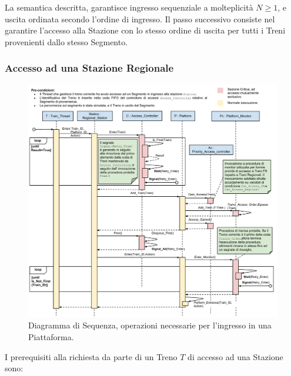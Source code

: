 	La semantica descritta, garantisce ingresso sequenziale a molteplicità $N\ge1$, e uscita ordinata secondo l'ordine di ingresso. Il passo successivo consiste nel garantire l'accesso alla Stazione con lo stesso ordine di uscita per tutti i Treni provenienti dallo stesso Segmento.


		\subsubsection{Accesso ad una Stazione Regionale}\label{subsubsec:regional_station_access}
		
		\begin{figure}[htbp]
			\includegraphics[trim = 55mm 0mm 0mm 0mm,scale=0.53]{imgs/platform_access_Sequence_Diagram.pdf}
			\caption{\footnotesize{Diagramma di Sequenza, operazioni necessarie per l'ingresso in una Piattaforma.}}
			\label{fig:platform_access}
		\end{figure}
		
		I prerequisiti alla richiesta da parte di un Treno $T$ di accesso ad una Stazione sono:
		
